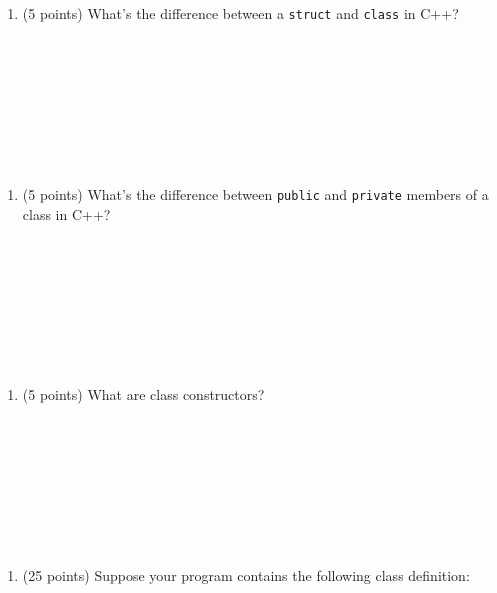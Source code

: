 \documentclass[
]{article}
\providecommand{\tightlist}{%
  \setlength{\itemsep}{0pt}\setlength{\parskip}{0pt}}
\begin{document}
\begin{verbatim}
\end{verbatim}

\pagebreak

\begin{enumerate}
\def\labelenumi{\arabic{enumi}.}
\setcounter{enumi}{2}
\tightlist
\item
  (5 points) What's the difference between a \texttt{struct} and
  \texttt{class} in C++?
\end{enumerate}

\begin{verbatim}









\end{verbatim}

\begin{enumerate}
\def\labelenumi{\arabic{enumi}.}
\setcounter{enumi}{3}
\tightlist
\item
  (5 points) What's the difference between \texttt{public} and
  \texttt{private} members of a class in C++?
\end{enumerate}

\begin{verbatim}









\end{verbatim}

\begin{enumerate}
\def\labelenumi{\arabic{enumi}.}
\setcounter{enumi}{4}
\tightlist
\item
  (5 points) What are class constructors?
\end{enumerate}

\begin{verbatim}









\end{verbatim}

\pagebreak

\begin{enumerate}
\def\labelenumi{\arabic{enumi}.}
\setcounter{enumi}{5}
\tightlist
\item
  (25 points) Suppose your program contains the following class
  definition:
\end{enumerate}
\end{document}

